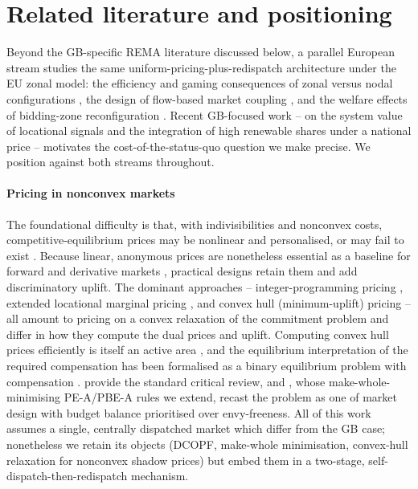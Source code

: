 \documentclass[review,3p,times]{elsarticle}
\theoremstyle{plain}
\theoremstyle{definition}
\begin{document}
\section{Related literature and positioning}
\label{sec:lit}

Beyond the GB-specific REMA literature discussed
below, a parallel European stream studies the same uniform-pricing-plus-redispatch
architecture under the EU zonal model: the efficiency and gaming consequences of
zonal versus nodal configurations \citep{eicke2022, ambrosius2020}, the design of
flow-based market coupling \citep{vandenbergh2016}, and the welfare effects of bidding-zone
reconfiguration \citep{trepper2015}. Recent GB-focused work -- on the system value of locational
signals and the integration of high renewable shares under a national
price \citep{newbery2023, grubbnewbery2018} -- motivates the cost-of-the-status-quo
question we make precise. We position against both streams throughout.

\paragraph{Pricing in nonconvex markets} The foundational difficulty is that,
with indivisibilities and nonconvex costs, competitive-equilibrium prices may be
nonlinear and personalised, or may fail to exist
\citep{bikhchandaniostroy2002, bichlerwaldherr2017}. Because linear, anonymous
prices are nonetheless essential as a baseline for forward and derivative markets
\citep{cramton2017}, practical designs retain them and add discriminatory uplift.
The dominant approaches -- integer-programming pricing \citep{oneill2005},
extended locational marginal pricing \citep{schiro2016}, and convex hull (minimum-uplift) pricing
\citep{hoganring2003, gribik2007} -- all amount to pricing on a convex
relaxation of the commitment problem and differ in how they compute the dual
prices and uplift. Computing convex hull prices efficiently is itself an active
area \citep{hua2017, andrianesis2021}, and the equilibrium interpretation of the
required compensation has been formalised as a binary equilibrium problem with
compensation  \citep{huppmann2018}. \citet{liberopoulos2016}
provide the standard critical review, and \citet{bichler2022}, whose
make-whole-minimising PE-A/PBE-A rules we extend, recast the problem as one of
market design with budget balance prioritised over envy-freeness. All of this
work assumes a single, centrally dispatched market which differ from the GB case; nonetheless we retain its objects (DCOPF,
make-whole minimisation, convex-hull relaxation for nonconvex shadow prices) but
embed them in a two-stage, self-dispatch-then-redispatch mechanism.
\end{document}
